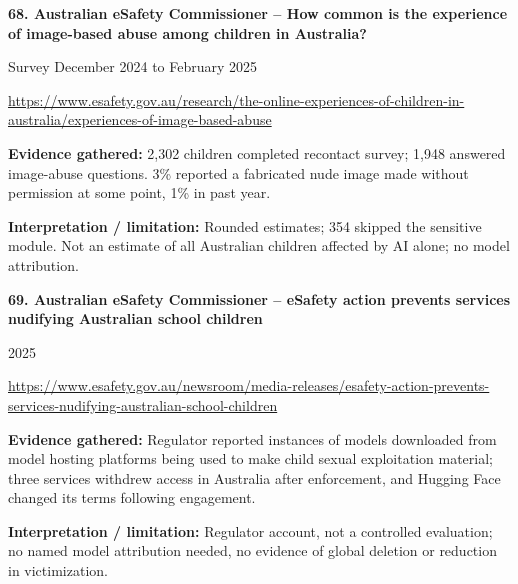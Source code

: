 \documentclass[11pt,a4paper]{article}
\begin{document}
\noindent\begin{minipage}{\linewidth}\textbf{68. Australian eSafety Commissioner -- How common is the experience of image-based abuse among children in Australia?}\par{\small Survey December 2024 to February 2025\par\url{https://www.esafety.gov.au/research/the-online-experiences-of-children-in-australia/experiences-of-image-based-abuse}}\par
\textbf{Evidence gathered:} 2,302 children completed recontact survey; 1,948 answered image-abuse questions. 3\% reported a fabricated nude image made without permission at some point, 1\% in past year.\par\textbf{Interpretation / limitation:} Rounded estimates; 354 skipped the sensitive module. Not an estimate of all Australian children affected by AI alone; no model attribution.\par\end{minipage}\par\vspace{2mm}
\noindent\begin{minipage}{\linewidth}\textbf{69. Australian eSafety Commissioner -- eSafety action prevents services nudifying Australian school children}\par{\small 2025\par\url{https://www.esafety.gov.au/newsroom/media-releases/esafety-action-prevents-services-nudifying-australian-school-children}}\par
\textbf{Evidence gathered:} Regulator reported instances of models downloaded from model hosting platforms being used to make child sexual exploitation material; three services withdrew access in Australia after enforcement, and Hugging Face changed its terms following engagement.\par\textbf{Interpretation / limitation:} Regulator account, not a controlled evaluation; no named model attribution needed, no evidence of global deletion or reduction in victimization.\par\end{minipage}\par\vspace{2mm}
\end{document}
